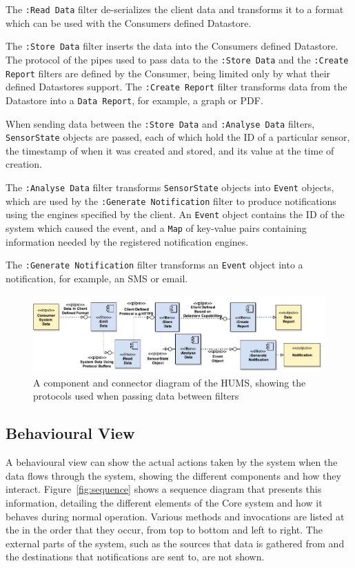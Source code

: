 \documentclass[10pt,a4paper]{article}
\begin{document}
The \texttt{:Read Data} filter de-serializes the client data and transforms it to a format which can be used with the Consumers defined Datastore. 

The \texttt{:Store Data} filter inserts the data into the Consumers defined Datastore.
The protocol of the pipes used to pass data to the \texttt{:Store Data} and the \texttt{:Create Report} filters are defined by the Consumer, being limited only by what their defined Datastores support.
The \texttt{:Create Report} filter transforms data from the Datastore into a \texttt{Data Report}, for example, a graph or PDF.

When sending data between the \texttt{:Store Data} and \texttt{:Analyse Data} filters, \texttt{SensorState} objects are passed, each of which hold the ID of a particular sensor, the timestamp of when it was created and stored, and its value at the time of creation. 

The \texttt{:Analyse Data} filter transforms \texttt{SensorState} objects into \texttt{Event} objects, which are used by the \texttt{:Generate Notification} filter to produce notifications using the engines specified by the client.
An \texttt{Event} object contains the ID of the system which caused the event, and a \texttt{Map} of key-value pairs containing information needed by the registered notification engines.

The \texttt{:Generate Notification} filter transforms an \texttt{Event} object into a notification, for example, an SMS or email. 

\begin{figure}[tbp]
  \includegraphics[width=\textwidth]{images/pipesAndFilters.pdf}
  \caption{A component and connector diagram of the HUMS, showing the protocols used when passing data between filters}
  \label{fig:pipesAndFilter}
\end{figure}

\subsection{Behavioural View}

A behavioural view can show the actual actions taken by the system when the data flows through the system, showing the different components and how they interact. Figure~\ref{fig:sequence} shows a sequence diagram that presents this information, detailing the different elements of the Core system and how it behaves during normal operation. Various methods and invocations are listed at the in the order that they occur, from top to bottom and left to right. The external parts of the system, such as the sources that data is gathered from and the destinations that notifications are sent to, are not shown.
\end{document}
